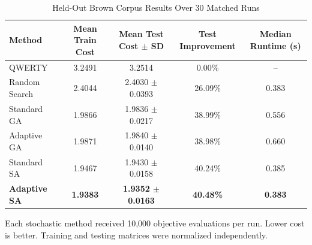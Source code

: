 \begin{table}[t]
\caption{Held-Out Brown Corpus Results Over 30 Matched Runs}
\label{tab:main-results}
\centering
\small
\begin{tabular}{lcccc}
\hline
Method & Mean Train Cost & Mean Test Cost $\pm$ SD & Test Improvement & Median Runtime (s) \\
\hline
QWERTY       & 3.2491 & 3.2514                 & 0.00\%  & --    \\
Random Search& 2.4044 & 2.4030 $\pm$ 0.0393   & 26.09\% & 0.383 \\
Standard GA  & 1.9866 & 1.9836 $\pm$ 0.0217   & 38.99\% & 0.556 \\
Adaptive GA  & 1.9871 & 1.9840 $\pm$ 0.0140   & 38.98\% & 0.660 \\
Standard SA  & 1.9467 & 1.9430 $\pm$ 0.0158   & 40.24\% & 0.385 \\
\textbf{Adaptive SA} & \textbf{1.9383} & \textbf{1.9352 $\pm$ 0.0163} & \textbf{40.48\%} & \textbf{0.383} \\
\hline
\end{tabular}
\vspace{2pt}

\footnotesize Each stochastic method received 10,000 objective evaluations per
run. Lower cost is better. Training and testing matrices were normalized
independently.
\end{table}

